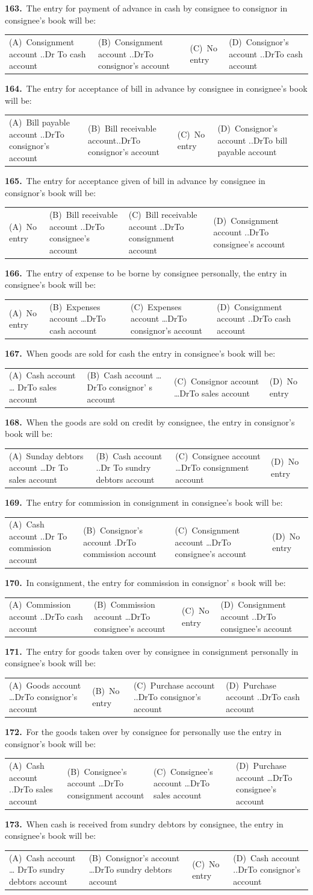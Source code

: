 \documentclass[11pt,a4paper]{article}
\makeatletter
\newcommand{\mcq}[6]{%
  \Needspace{4\baselineskip}%
  \par\medskip\noindent\textbf{#1.}\ #2\par\nopagebreak
  \noindent\begin{tabularx}{\linewidth}{@{\hspace{1.5em}}*{4}{>{\raggedright\arraybackslash}X}@{}}
    (A)~#3 & (B)~#4 & (C)~#5 & (D)~#6
  \end{tabularx}\par}
\makeatother
\begin{document}
\mcq{163}{The entry for payment of advance in cash by consignee to consignor in consignee’s book will be:}{Consignment account ..Dr To cash account}{Consignment account ..DrTo consignor’s account}{No entry}{Consignor’s account ..DrTo cash account}
\mcq{164}{The entry for acceptance of bill in advance by consignee in consignee’s book will be:}{Bill payable account ..DrTo consignor’s account}{Bill receivable account..DrTo consignor’s account}{No entry}{Consignor’s account ..DrTo bill payable account}
\mcq{165}{The entry for acceptance given of bill in advance by consignee in consignor’s book will be:}{No entry}{Bill receivable account ..DrTo consignee’s account}{Bill receivable account ..DrTo consignment account}{Consignment account ..DrTo consignee’s account}
\mcq{166}{The entry of expense to be borne by consignee personally, the entry in consignee’s book will be:}{No entry}{Expenses account …DrTo cash account}{Expenses account …DrTo consignor’s account}{Consignment account ..DrTo cash account}
\mcq{167}{When goods are sold for cash the entry in consignee’s book will be:}{Cash account … DrTo sales account}{Cash account … DrTo consignor’ s account}{Consignor account …DrTo sales account}{No entry}
\mcq{168}{When the goods are sold on credit by consignee, the entry in consignor’s book will be:}{Sunday debtors account …Dr To sales account}{Cash account ..Dr To sundry debtors account}{Consignee account …DrTo consignment account}{No entry}
\mcq{169}{The entry for commission in consignment in consignee’s book will be:}{Cash account ..Dr To commission account}{Consignor’s account .DrTo commission account}{Consignment account …DrTo consignee’s account}{No entry}
\mcq{170}{In consignment, the entry for commission in consignor’ s book will be:}{Commission account ..DrTo cash account}{Commission account …DrTo consignee’s account}{No entry}{Consignment account ..DrTo consignee’s account}
\mcq{171}{The entry for goods taken over by consignee in consignment personally in consignee’s book will be:}{Goods account …DrTo consignor’s account}{No entry}{Purchase account ..DrTo consignor’s account}{Purchase account ..DrTo cash account}
\mcq{172}{For the goods taken over by consignee for personally use the entry in consignor’s book will be:}{Cash account ..DrTo sales account}{Consignee’s account …DrTo consignment account}{Consignee’s account …DrTo sales account}{Purchase account …DrTo consignee’s account}
\mcq{173}{When cash is received from sundry debtors by consignee, the entry in consignee’s book will be:}{Cash account … DrTo sundry debtors account}{Consignor’s account …DrTo sundry debtors account}{No entry}{Cash account ..DrTo consignor’s account}
\end{document}
